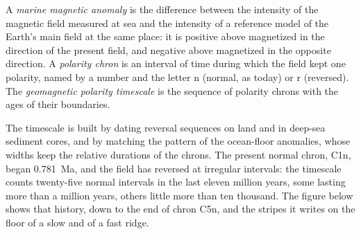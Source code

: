 \begin{definition}\label{def:b1:plate-kinematics:magnetic-anomaly}
A \emph{marine magnetic anomaly} is the
difference between the intensity of the magnetic field measured at sea and the
intensity of a reference model of the Earth's main field at the same place: it
is positive above  magnetized in the direction of the present field, and
negative above  magnetized in the opposite direction. A \emph{polarity
chron} is an interval of time during which the field kept
one polarity, named by a number and the letter n (normal, as today) or r
(reversed). The \emph{geomagnetic polarity timescale} is the sequence of polarity chrons with the ages of their
boundaries.
\end{definition}

The timescale is built by dating reversal sequences on land and in deep-sea
sediment cores, and by matching the pattern of the ocean-floor anomalies, whose
widths keep the relative durations of the chrons. The present normal chron, C1n, began
\qty{0.781}{Ma}, and the field has reversed at irregular intervals: the
timescale counts twenty-five normal intervals in the last eleven million years,
some lasting more than a million years, others little more than ten
thousand. The
figure below shows that history, down to the end of chron C5n, and the stripes
it writes on the floor of a slow and of a fast ridge.

